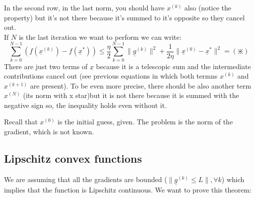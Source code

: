 In the second row, in the last norm, you should have $x^{(k)}$ also (notice the property) but it's not there because it's summed to it's opposite so they cancel out.\\ 
If $N$ is the last iteration we want to perform we can write:
\[
    \sum_{k=0}^{N-1}   \left(f(\underline{x}^{(k)})-f(\underline{x}^*)\right) \leq \dfrac{\eta}{2} \sum_{k=0}^{N-1}\|\underline{g}^{(k)}\|^2 + \dfrac{1}{2 \eta}\|\underline{x}^{(0)} - \underline{x}^*\|^2  = (\divideontimes)
\]
There are just two terms of $\underline{x}$ because it is a telescopic sum and the intermediate contributions cancel out (see previous equations in which both termns $x^{(k)}$ and $x^{(k+1)}$ are present). To be even more precise, there should be also another term $x^{(N)}$ (its norm with x star)but it is not there because it is summed with the negative sign so, the inequality holds even without it.

Recall that $x^{(0)}$ is the initial guess, given. The problem is the norm of the gradient, which is not known. 

\subsection{Lipschitz convex functions}
We are assuming that all the gradients are bounded ($\|\underline{g}^{(k)} \leq L\|, \forall k$) which implies that the function is Lipschitz continuous. We want to prove this theorem:

